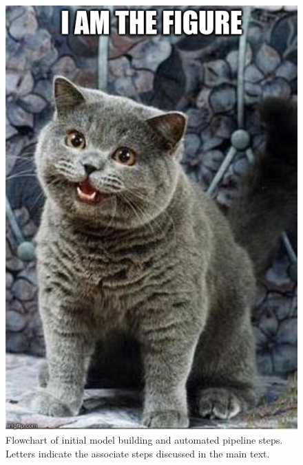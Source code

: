 \begin{figure}
	\centering
		\includegraphics[scale=0.3]{images/figure_filler.jpg}
	\caption[Flowchart of initial model building and automated pipeline steps]{Flowchart of initial model building and automated pipeline steps. Letters indicate the associate steps discussed in the main text.} \label{fig-4-1}
\end{figure}


